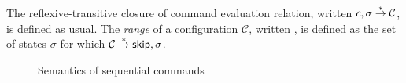 \documentclass[11pt]{report}
\begin{document}
The reflexive-transitive closure of command evaluation relation, written $c,\sigma \stackrel{\ast}{\rightarrow} \mathcal{C}$, is defined as usual. The \emph{range} of a configuration $\mathcal{C}$, written , is defined as the set of states $\sigma$ for which $\mathcal{C} \stackrel{\ast}{\rightarrow} \operatorname{\mathsf{skip}},\sigma$. 

\begin{figure}[ht]
    \centering

    \vspace{1em}


    \vspace{1em}


    \vspace{1em}


    \vspace{1em}


    \vspace{1em}


    \vspace{1em}


    \vspace{1em}


    \vspace{1em}


    \vspace{1em}


    \caption{\label{fig:sequential-command-semantics} Semantics of sequential commands}
\end{figure} 
 
\end{document}
